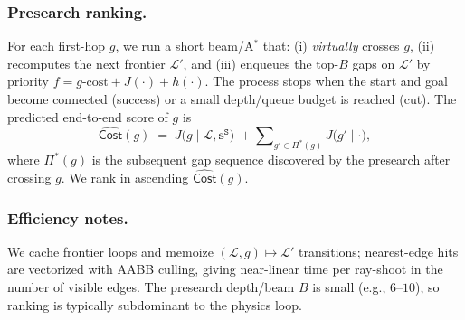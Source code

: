 \subsubsection{Presearch ranking.}
For each first-hop $g$, we run a short beam/A$^\ast$ that: (i) \emph{virtually} crosses $g$, (ii) recomputes the next frontier $\mathcal{L}'$, and (iii) enqueues the top-$B$ gaps on $\mathcal{L}'$ by priority $f = g\text{-cost} + J(\cdot) + h(\cdot)$. The process stops when the start and goal become connected (success) or a small depth/queue budget is reached (cut). The predicted end-to-end score of $g$ is
\begin{equation}\label{eq:total-cost}
\widehat{\mathsf{Cost}}(g) \;=\;
J\!\big(g \mid \mathcal{L}, \mathbf{s}^{\texttt{S}}\big)
\;+\!\!\!\sum\nolimits_{g'\in\Pi^*(g)}\!\!\! J\!\big(g' \mid \cdot \big),
\end{equation}
where $\Pi^*(g)$ is the subsequent gap sequence discovered by the presearch after crossing $g$. We rank in ascending $\widehat{\mathsf{Cost}}(g)$.


\subsubsection{Efficiency notes.}
We cache frontier loops and memoize $(\mathcal{L},g)\!\mapsto\!\mathcal{L}'$ transitions; 
nearest-edge hits are vectorized with AABB culling, 
giving near-linear time per ray-shoot in the number of visible edges. 
The presearch depth/beam $B$ is small (e.g., $6$–$10$), 
so ranking is typically subdominant to the physics loop.